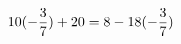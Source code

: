 \documentclass[preview]{standalone}
\begin{document}
\begin{align*}
\special{dvisvgm:raw <g id='unique000'>}10 (- \frac{3}{7}) + 20 = 8 - 18 (- \frac{3}{7})\special{dvisvgm:raw </g>}
\end{align*}
\end{document}
